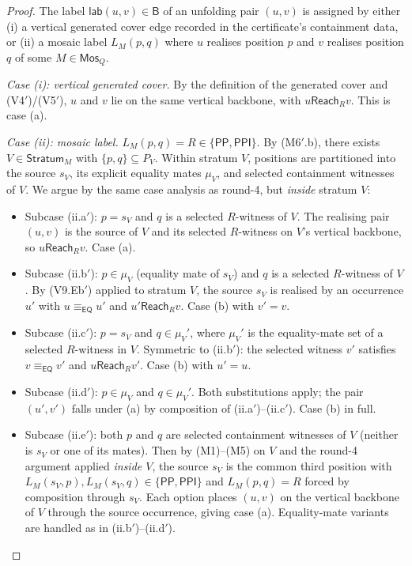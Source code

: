 \documentclass[11pt]{article}
\newcommand{\Base}{\mathsf{B}}
\newcommand{\EQ}{\mathsf{EQ}}
\newcommand{\PP}{\mathsf{PP}}
\newcommand{\PPI}{\mathsf{PPI}}
\newcommand{\Mos}{\mathsf{Mos}}
\newcommand{\Reach}{\mathrel{\mathsf{Reach}}}
\newcommand{\eqc}{\equiv_{\EQ}}
\newcommand{\lab}{\mathsf{lab}}
\newcommand{\Stratum}{\mathsf{Stratum}}
\begin{document}
\begin{proof}
The label $\lab(u,v)\in\Base$ of an unfolding pair $(u,v)$ is
assigned by either (i) a vertical generated cover edge recorded in
the certificate's containment data, or (ii) a mosaic label
$L_M(p,q)$ where $u$ realises position $p$ and $v$ realises
position $q$ of some $M\in\Mos_Q$.

\emph{Case (i): vertical generated cover.}  By the definition of the
generated cover and (V4$'$)/(V5$'$), $u$ and $v$ lie on the same
vertical backbone, with $u\Reach_R v$.  This is case (a).

\emph{Case (ii): mosaic label.}  $L_M(p,q)=R\in\{\PP,\PPI\}$.  By
(M6$'$.b), there exists $V\in\Stratum_M$ with
$\{p,q\}\subseteq P_V$.  Within stratum $V$, positions are
partitioned into the source $s_V$, its explicit equality mates
$\mu_V$, and selected containment witnesses of $V$.  We argue by
the same case analysis as round-4, but \emph{inside} stratum $V$:

\begin{itemize}
\item Subcase (ii.a$'$): $p=s_V$ and $q$ is a selected $R$-witness
  of $V$.  The realising pair $(u,v)$ is the source of $V$ and its
  selected $R$-witness on $V$'s vertical backbone, so
  $u\Reach_R v$.  Case (a).

\item Subcase (ii.b$'$): $p\in\mu_V$ (equality mate of $s_V$) and
  $q$ is a selected $R$-witness of $V$.  By (V9.Eb$'$) applied to
  stratum $V$, the source $s_V$ is realised by an occurrence $u'$
  with $u\eqc u'$ and $u'\Reach_R v$.  Case (b) with $v'=v$.

\item Subcase (ii.c$'$): $p=s_V$ and $q\in\mu_V'$, where $\mu_V'$
  is the equality-mate set of a selected $R$-witness in $V$.
  Symmetric to (ii.b$'$): the selected witness $v'$ satisfies
  $v\eqc v'$ and $u\Reach_R v'$.  Case (b) with $u'=u$.

\item Subcase (ii.d$'$): $p\in\mu_V$ and $q\in\mu_V'$.  Both
  substitutions apply; the pair $(u',v')$ falls under (a) by
  composition of (ii.a$'$)--(ii.c$'$).  Case (b) in full.

\item Subcase (ii.e$'$): both $p$ and $q$ are selected containment
  witnesses of $V$ (neither is $s_V$ or one of its mates).  Then by
  (M1)--(M5) on $V$ and the round-4 argument applied \emph{inside
  $V$}, the source $s_V$ is the common third position with
  $L_M(s_V,p),L_M(s_V,q)\in\{\PP,\PPI\}$ and $L_M(p,q)=R$ forced
  by composition through $s_V$.  Each option places $(u,v)$ on the
  vertical backbone of $V$ through the source occurrence, giving
  case (a).  Equality-mate variants are handled as in
  (ii.b$'$)--(ii.d$'$).
\end{itemize}


\end{proof}
\end{document}
